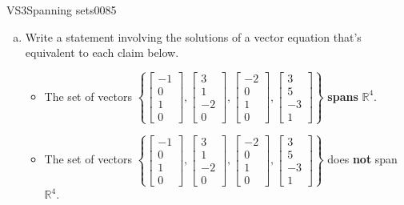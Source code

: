 \begin{exercise}{VS3}{Spanning sets}{0085} 
\begin{exerciseStatement} 

\begin{enumerate}[(a)]
\item  

 Write a statement involving the solutions of a vector equation that's equivalent to each claim below. 

 

\begin{itemize}
\item  

 The set of vectors \(\left\{ \left[\begin{array}{c}
-1 \\
0 \\
1 \\
0
\end{array}\right] , \left[\begin{array}{c}
3 \\
1 \\
-2 \\
0
\end{array}\right] , \left[\begin{array}{c}
-2 \\
0 \\
1 \\
0
\end{array}\right] , \left[\begin{array}{c}
3 \\
5 \\
-3 \\
1
\end{array}\right] \right\}\) \textbf{spans} \(\mathbb R^4\). 

 
\item  

 The set of vectors \(\left\{ \left[\begin{array}{c}
-1 \\
0 \\
1 \\
0
\end{array}\right] , \left[\begin{array}{c}
3 \\
1 \\
-2 \\
0
\end{array}\right] , \left[\begin{array}{c}
-2 \\
0 \\
1 \\
0
\end{array}\right] , \left[\begin{array}{c}
3 \\
5 \\
-3 \\
1
\end{array}\right] \right\}\) does \textbf{not} span \(\mathbb R^4\). 


\end{itemize}
\end{enumerate}
\end{exerciseStatement}
\end{exercise}
